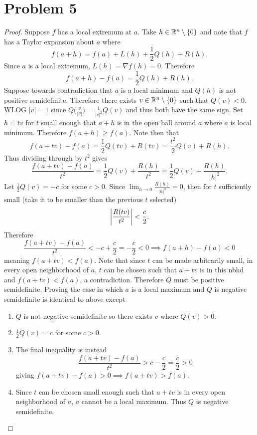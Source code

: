 \documentclass{eeleyes}
\begin{document}
\section*{Problem 5}
\begin{proof}
    Suppose $f$ has a local extremum at $a$. Take $h \in \mathbb{R}^n \setminus \qty{0}$ and note that $f$ has a Taylor expansion about $a$ where
    \[
        f(a + h) = f(a) + L(h) + \frac{1}{2} Q(h) + R(h)
    .\]
    Since $a$ is a local extremum, $L(h) = \nabla f(h) = 0$. Therefore
    \[
        f(a + h) - f(a) = \frac{1}{2} Q(h) + R(h)
    .\]
    Suppose towards contradiction that $a$ is a local minimum and $Q(h)$ is not positive semidefinite. Therefore there exists $v \in \mathbb{R}^n \setminus \qty{0}$ such that $Q(v) < 0$. WLOG $|v| = 1$ since $Q\bigl(\frac{v}{|v|}\bigr) = \frac{1}{|v|^2} Q(v)$ and thus both have the same sign. Set $h = tv$ for $t$ small enough that $a+h$ is in the open ball around $a$ where $a$ is local minimum. Therefore $f(a + h) \geq f(a)$. Note then that 
    \[
        f(a + tv) - f(a) = \frac{1}{2} Q(tv) + R(tv) = \frac{t^2}{2} Q(v) + R(h)
    .\]
    Thus dividing through by $t^2$ gives
    \[
        \frac{f(a+tv) - f(a)}{t^2} = \frac{1}{2} Q(v) + \frac{R(h)}{t^2} = \frac{1}{2} Q(v) + \frac{R(h)}{|h|^2}
    .\]
    Let $\frac{1}{2} Q(v) = -c$ for some $c > 0$. Since $\lim_{h \to 0} \frac{R(h)}{|h|^2} = 0$, then for $t$ sufficiently small (take it to be smaller than the previous $t$ selected)
    \[
        \qty|\frac{R(tv)}{t^2}| < \frac{c}{2}
    .\]
    Therefore
    \[
        \frac{f(a + tv) - f(a)}{t^2} < -c + \frac{c}{2} = -\frac{c}{2} < 0 \implies f(a + h) - f(a) < 0
    \]
    meaning $f(a + tv) < f(a)$. Note that since $t$ can be made arbitrarily small, in every open neighborhood of $a$, $t$ can be chosen such that $a+tv$ is in this nbhd and $f(a+tv) < f(a)$, a contradiction. Therefore $Q$ must be positive semidefinite.
    Proving the case in which $a$ is a local maximum and $Q$ is negative semidefinite is identical to above except
    \begin{enumerate}
        \item $Q$ is not negative semidefinite so there exists $v$ where $Q(v) > 0$.
        \item $\frac{1}{2} Q(v) = c$ for some $c > 0$.
        \item The final inequality is instead
            \[
                \frac{f(a+tv) - f(a)}{t^2} > c - \frac{c}{2} = \frac{c}{2} > 0
            \]
            giving $f(a + tv) - f(a) > 0 \implies f(a + tv) > f(a)$.
        \item Since $t$ can be chosen small enough such that $a + tv$ is in every open neighborhood of $a$, $a$ cannot be a local maximum. Thus $Q$ is negative semidefinite.
    \end{enumerate}
\end{proof}
\end{document}
